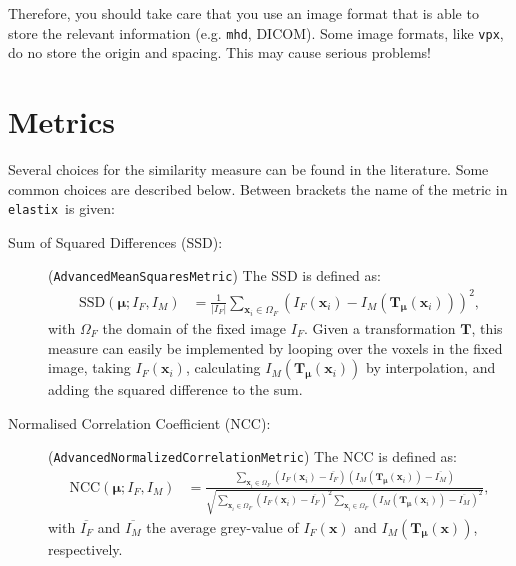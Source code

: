 \documentclass[]{report}
\newcommand{\elastix}{\texttt{elastix}}
\newcommand{\vx}{\bm{x}}
\newcommand{\vmu}{\bm{\mu}}
\newcommand{\vT}{\bm{T}}
\newcommand{\vTm}{\bm{T}_{\vmu}}
\begin{document}
Therefore, you should take care that you use an image format that
is able to store the relevant information (e.g. \texttt{mhd},
DICOM). Some image formats, like \texttt{vpx}, do no store the
origin and spacing. This may cause serious problems!

\section{Metrics}\label{sec:comp:metric}

Several choices for the similarity measure can be found in the
literature. Some common choices are described below. Between brackets
the name of the metric in \elastix\ is given:

\begin{description}
\item[Sum of Squared Differences (SSD):] (\texttt{AdvancedMeanSquaresMetric}) The SSD is defined as:
\begin{align}
\mathrm{SSD}(\vmu;I_F,I_M) &= \frac{1}{|I_F|} \sum\limits_{\vx_i \in
\Omega_F} \left( I_F(\vx_i) - I_M(\vT_{\vmu}(\vx_i))
\right)^2,\label{eq:ssd}
\end{align}
with $\Omega_F$ the domain of the fixed image $I_F$. Given a
transformation $\vT$, this measure can easily be implemented by
looping over the voxels in the fixed image, taking $I_F(\vx_i)$,
calculating $I_M(\vT_{\vmu}(\vx_i))$ by interpolation, and adding the
squared difference to the sum.

\item[Normalised Correlation Coefficient (NCC):] (\texttt{AdvancedNormalizedCorrelationMetric}) The NCC is defined as:
\begin{align}
\mathrm{NCC}(\vmu;I_F,I_M) &= \frac{ \sum\limits_{\vx_i \in \Omega_F}
\left( I_F(\vx_i) - \overline{I_F} \right) \left( I_M(\vTm(\vx_i)) -
\overline{I_M} \right) }{ \sqrt{\sum\limits_{\vx_i \in \Omega_F}
\left( I_F(\vx_i) - \overline{I_F} \right)^2 \sum\limits_{\vx_i \in
\Omega_F} \left( I_M(\vTm(\vx_i)) - \overline{I_M} \right)^2}
},\label{eq:ncc}
\end{align}
with $\overline{I_F}$ and $\overline{I_M}$ the average grey-value
of $I_F(\vx)$ and $I_M(\vT_{\vmu}(\vx))$, respectively.


\end{description}
\end{document}
